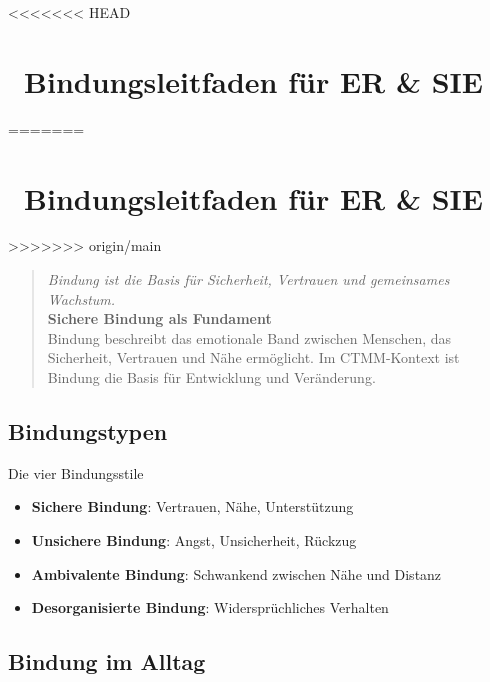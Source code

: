 
\newpage
<<<<<<< HEAD
\section*{\textcolor{ctmmBlue}{\faHeart~Bindungsleitfaden für ER \& SIE}}
=======
\section*{\texorpdfstring{\textcolor{ctmmBlue}{\faHeart~Bindungsleitfaden für ER \& SIE}}{Bindungsleitfaden für ER \& SIE}}
>>>>>>> origin/main
\label{sec:bindungsleitfaden}

\begin{quote}
\textit{\textcolor{ctmmOrange}{Bindung ist die Basis für Sicherheit, Vertrauen und gemeinsames Wachstum.}}\\
\textbf{\textcolor{ctmmBlue}{Sichere Bindung als Fundament}}\\
Bindung beschreibt das emotionale Band zwischen Menschen, das Sicherheit, Vertrauen und Nähe ermöglicht. Im CTMM-Kontext ist Bindung die Basis für Entwicklung und Veränderung.
\end{quote}

\subsection*{\texorpdfstring{\textcolor{ctmmBlue}{Bindungstypen}}{Bindungstypen}}

\begin{ctmmBlueBox}{Die vier Bindungsstile}
\begin{itemize}
  \item \textbf{Sichere Bindung}: Vertrauen, Nähe, Unterstützung
  \item \textbf{Unsichere Bindung}: Angst, Unsicherheit, Rückzug
  \item \textbf{Ambivalente Bindung}: Schwankend zwischen Nähe und Distanz
  \item \textbf{Desorganisierte Bindung}: Widersprüchliches Verhalten
\end{itemize}
\end{ctmmBlueBox}

\subsection*{\texorpdfstring{\textcolor{ctmmBlue}{Bindung im Alltag}}{Bindung im Alltag}}


